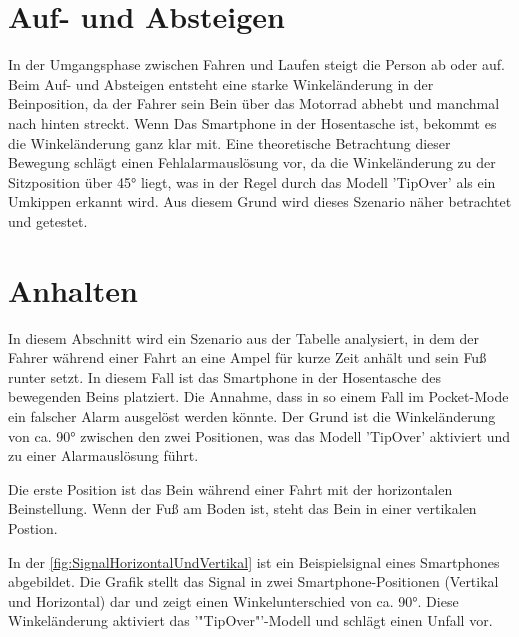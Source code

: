 \section{Auf- und Absteigen} \label{sec:AufAbsteigen} %
In der Umgangsphase zwischen Fahren und Laufen steigt die Person ab oder auf. Beim Auf- und Absteigen entsteht eine starke Winkeländerung in der Beinposition, da der Fahrer sein Bein über das Motorrad abhebt und manchmal nach hinten streckt. Wenn Das Smartphone in der Hosentasche ist, bekommt es die Winkeländerung ganz klar mit.
Eine theoretische Betrachtung dieser Bewegung schlägt einen Fehlalarmauslösung vor, da die Winkeländerung zu der Sitzposition über \ang{45} liegt, was in der Regel durch das Modell 'TipOver' als ein Umkippen erkannt wird.
Aus diesem Grund wird dieses Szenario näher betrachtet und getestet.






\section{Anhalten} \label{sec:AmpelStehen} %
In diesem Abschnitt wird ein Szenario aus der Tabelle analysiert, in dem der Fahrer während einer Fahrt an eine Ampel für kurze Zeit anhält und sein Fuß runter setzt. In diesem Fall ist das Smartphone in der Hosentasche des bewegenden Beins platziert.
Die Annahme, dass in so einem Fall im Pocket-Mode ein falscher Alarm ausgelöst werden könnte. Der Grund ist die Winkeländerung von ca. \ang{90} zwischen den zwei Positionen, was das Modell 'TipOver' aktiviert und zu einer Alarmauslösung führt.

Die erste Position ist das Bein während einer Fahrt mit der horizontalen Beinstellung. Wenn der Fuß am Boden ist, steht das Bein in einer vertikalen Postion.

In der \autoref{fig:SignalHorizontalUndVertikal} ist ein Beispielsignal eines Smartphones abgebildet. Die Grafik stellt das Signal in zwei Smartphone-Positionen (Vertikal und Horizontal) dar und zeigt einen Winkelunterschied von ca. \ang{90}. Diese Winkeländerung aktiviert das '"TipOver"'-Modell und schlägt einen Unfall vor.

